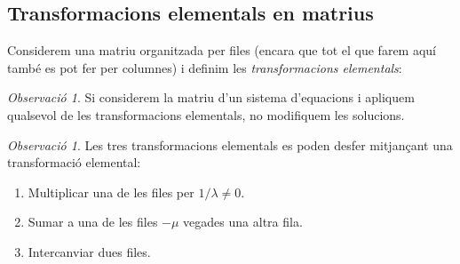 \documentclass[a4paper,12pt,twoside]{article}
\newcommand{\1}{\mathbf{1}}
\newcommand{\0}{\mathbf{0}}
\theoremstyle{definition}
\newtheorem{definicio}[teorema]{Definició}
\theoremstyle{remark}
\newtheorem{observacio}[teorema]{Observació}
\begin{document}
\subsection{Transformacions elementals en matrius}
Considerem una matriu organitzada per files (encara que tot el que farem aquí també es pot fer per columnes) i definim les \emph{transformacions elementals}:
\begin{center}
\end{center}
\begin{observacio}
	Si considerem la matriu d'un sistema d'equacions i apliquem qualsevol de les transformacions elementals, no modifiquem les solucions.
\end{observacio}
\begin{observacio}
	Les tres transformacions elementals es poden desfer mitjançant una transformació elemental:
	\begin{enumerate}[\bf 1.]
		\item Multiplicar una de les files per $1/\lambda\neq 0$.
		\item Sumar a una de les files $-\mu$ vegades una altra fila.
		\item Intercanviar dues files.
	\end{enumerate} 
\end{observacio}
\end{document}
